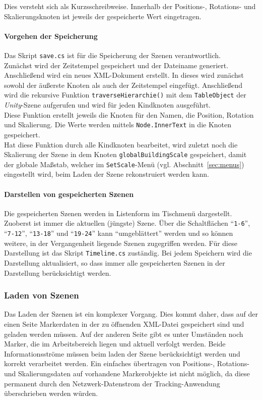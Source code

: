 Dies versteht sich als Kurzsschreibweise. Innerhalb der Positions-, Rotations- und Skalierungsknoten ist jeweils der gespeicherte Wert eingetragen.

\paragraph{Vorgehen der Speicherung}
Das Skript \texttt{save.cs} ist für die Speicherung der Szenen verantwortlich.\\
Zunächst wird der Zeitstempel gespeichert und der Dateiname generiert. Anschließend wird ein neues XML-Dokument erstellt. In dieses wird zunächst sowohl der äußerste Knoten als auch der Zeitstempel eingefügt. Anschließend wird die rekursive Funktion \texttt{traverseHierarchie()} mit dem \texttt{TableObject} der \emph{Unity}-Szene aufgerufen und wird für jeden Kindknoten ausgeführt. \\
Diese Funktion erstellt jeweils die Knoten für den Namen, die Position, Rotation und Skalierung. Die Werte werden mittels \texttt{Node.InnerText} in die Knoten gespeichert.\\
Hat diese Funktion durch alle Kindknoten bearbeitet, wird zuletzt noch die Skalierung der Szene in dem Knoten \texttt{globalBuildingScale} gespeichert, damit der globale Maßstab, welcher im \texttt{SetScale}-Menü (vgl. Abschnitt~\ref{sec:menus}) eingestellt wird, beim Laden der Szene rekonstruiert werden kann.

\paragraph{Darstellen von gespeicherten Szenen} Die gespeicherten Szenen werden in Listenform im Tischmenü dargestellt. Zuoberst ist immer die aktuellen (jüngste) Szene. Über die Schaltflächen "`\texttt{1-6}"', "`\texttt{7-12}"', "`\texttt{13-18}"' und "`\texttt{19-24}"' kann "`umgeblättert"' werden und so können weitere, in der Vergangenheit liegende Szenen zugegriffen werden. Für diese Darstellung ist das Skript \texttt{Timeline.cs} zuständig. Bei jedem Speichern wird die Darstellung aktualisiert, so dass immer alle gespeicherten Szenen in der Darstellung berücksichtigt werden.

\subsubsection{Laden von Szenen}
\label{Laden}
Das Laden der Szenen ist ein komplexer Vorgang. Dies kommt daher, dass auf der einen Seite Markerdaten in der zu öffnenden XML-Datei gespeichert sind und geladen werden müssen. Auf der anderen Seite gibt es unter Umständen noch Marker, die im Arbeitsbereich liegen und aktuell verfolgt werden. Beide Informationsströme müssen beim laden der Szene berücksichtigt werden und korrekt verarbeitet werden. Ein einfaches übertragen von Positions-, Rotations- und Skalierungsdaten auf vorhandene Markerobjekte ist nicht möglich, da diese permanent durch den Netzwerk-Datenstrom der Tracking-Anwendung überschrieben werden würden.
